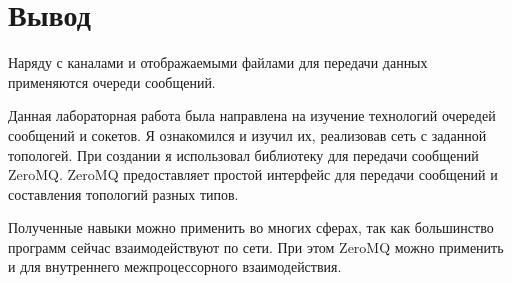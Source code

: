 \documentclass[pdf, unicode, 12pt, a4paper,oneside,fleqn]{article}
\begin{document}
\pagebreak

\section{Вывод}
Наряду с каналами и отображаемыми файлами для передачи данных применяются очереди сообщений.

Данная лабораторная работа была направлена на изучение технологий очередей сообщений 
и сокетов. Я ознакомился и изучил их, реализовав сеть с заданной топологей. При создании я использовал
библиотеку для передачи сообщений ZeroMQ. ZeroMQ предоставляет простой интерфейс для передачи сообщений и 
составления топологий разных типов.

Полученные навыки можно применить во многих сферах, так как большинство программ сейчас взаимодействуют по сети.
При этом ZeroMQ можно применить и для внутреннего межпроцессорного взаимодействия.
\end{document}
